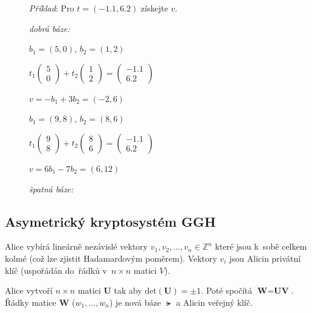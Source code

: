 \begin{figure}[ht]
    \emph{Příklad}: Pro $t = (-1.1, 6.2)$ získejte $v$.

    \begin{minipage}{0.5\textwidth}
        \centering
        \caption*{\emph{dobrá báze:}}

        $b_1 = (5, 0)$, $b_2 = (1, 2)$

        $t_1\left(\begin{matrix}5\\0\end{matrix}\right) + t_2 \left(\begin{matrix}1\\2\end{matrix}\right) = \left(\begin{matrix}-1.1\\6.2\end{matrix}\right)$

        $v = -b_1 + 3b_2 = (-2, 6)$
    \end{minipage}\hfill\begin{minipage}{0.5\textwidth}
        \centering
        \caption*{\emph{špatná báze:}}

        $b_1 = (9, 8)$, $b_2 = (8, 6)$

        $t_1\left(\begin{matrix}9\\8\end{matrix}\right) + t_2 \left(\begin{matrix}8\\6\end{matrix}\right) = \left(\begin{matrix}-1.1\\6.2\end{matrix}\right)$

        $v = 6b_1 - 7b_2 = (6, 12)$
    \end{minipage}
\end{figure}


\subsection{Asymetrický kryptosystém GGH}

Alice vybírá lineárně nezávislé vektory $v_1, v_2, \dots, v_n \in \mathbb{Z}^n$ které jsou k~sobě celkem kolmé (což lze zjistit Hadamardovým poměrem).
Vektory $v_i$ jsou Alicin privátní klíč (uspořádán do~řádků v~$n \times n$ matici $V$).

Alice vytvoří $n \times n$ matici $\textbf{U}$ tak aby $\text{det}(\textbf{U}) = \pm 1$.
Poté spočítá $\textbf{W} = \textbf{UV}$.
Řádky matice $\textbf{W}$ ($w_1, \dots, w_n$) je nová báze $\lat$ a Alicin veřejný klíč.


